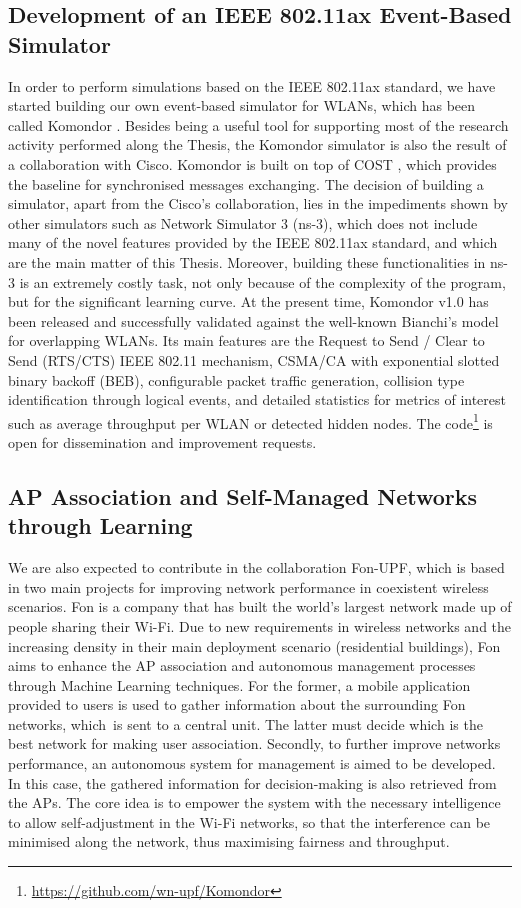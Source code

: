 \documentclass[12pt, a4paper,twoside]{tesi_upf}
\begin{document}
			\subsection{Development of an IEEE 802.11ax Event-Based Simulator}
			\label{section:cisco_project}				
				In order to perform simulations based on the IEEE 802.11ax standard, we have started building our own event-based simulator for WLANs, which has been called Komondor \cite{barrachina2017komondor}. Besides being a useful tool for supporting most of the research activity performed along the Thesis, the Komondor simulator is also the result of a collaboration with Cisco. Komondor is built on top of COST \cite{chen2005sense}, which provides the baseline for synchronised messages exchanging. The decision of building a simulator, apart from the Cisco's collaboration, lies in the impediments shown by other simulators such as Network Simulator 3 (ns-3), which does not include many of the novel features provided by the IEEE 802.11ax standard, and which are the main matter of this Thesis. Moreover, building these functionalities in ns-3 is an extremely costly task, not only because of the complexity of the program, but for the significant learning curve. At the present time, Komondor v1.0 has been released and successfully validated against the well-known Bianchi's model for overlapping WLANs. Its main features are the Request to Send / Clear to Send (RTS/CTS) IEEE 802.11 mechanism, CSMA/CA with exponential slotted binary backoff (BEB), configurable packet traffic generation, collision type identification through logical events, and detailed statistics for metrics of interest such as average throughput per WLAN or detected hidden nodes. The code\footnote{\url{https://github.com/wn-upf/Komondor}} is open for dissemination and improvement requests.
				
			\subsection{AP Association and Self-Managed Networks through Learning}
			\label{section:fon_project}	
				We are also expected to contribute in the collaboration Fon-UPF, which is based in two main projects for improving network performance in coexistent wireless scenarios. Fon is a company that has built the world's largest network made up of people sharing their Wi-Fi. Due to new requirements in wireless networks and the increasing density in their main deployment scenario (residential buildings), Fon aims to enhance the AP association and autonomous management processes through Machine Learning techniques. For the former, a mobile application provided to users is used to gather information about the surrounding Fon networks, which is sent to a central unit. The latter must decide which is the best network for making user association. Secondly, to further improve networks performance, an autonomous system for management is aimed to be developed. In this case, the gathered information for decision-making is also retrieved from the APs. The core idea is to empower the system with the necessary intelligence to allow self-adjustment in the Wi-Fi networks, so that the interference can be minimised along the network, thus maximising fairness and throughput.
			
\end{document}
